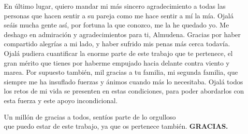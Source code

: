 En último lugar, quiero mandar mi más sincero agradecimiento a todas las personas que hacen sentir a su pareja como me hace sentir a mí la mía. Ojalá seáis mucha gente así, por fortuna la que conozco, me la he quedado yo. Me deshago en admiración y agradecimientos para ti, Almudena. Gracias por haber compartido alegrías a mi lado, y haber sufrido mis penas más cerca todavía. Ojalá pudiera cuantificar la enorme parte de este trabajo que te pertenece, el gran mérito que tienes por haberme empujado hacia delante contra viento y marea. Por supuesto también, mil gracias a tu familia, mi segunda familia, que siempre me ha insuflado fuerzas y ánimos cuando más lo necesitaba. Ojalá todos los retos de mi vida se presenten en estas condiciones, para poder abordarlos con esta fuerza y este apoyo incondicional.


\flushright Un millón de gracias a todos, sentíos parte de lo orgulloso\\ que puedo estar de este trabajo, ya que os pertenece también. \textbf{GRACIAS.}

\flushleft
\restoregeometry


